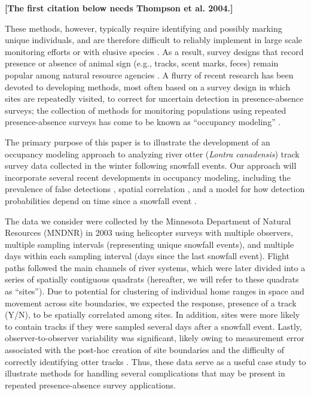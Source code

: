 \documentclass[11pt]{article}
\begin{document}
\textbf{[The first citation below needs Thompson et al. 2004.]}

These methods, however, typically require identifying and possibly marking
unique individuals, and are therefore difficult to reliably implement in large
scale monitoring efforts or with elusive species \citep{Stanley2005,
Johnson2008}.  As a result, survey designs that record presence or absence of
animal sign (e.g., tracks, scent marks, feces) remain popular among natural
resource agencies \citep{Stanley2005}.  A flurry of recent research has been
devoted to developing methods, most often based on a survey design in which
sites are repeatedly visited, to correct for uncertain detection in
presence-absence surveys; the collection of methods for monitoring populations
using repeated presence-absence surveys has come to be known as ``occupancy
modeling'' \citep{MacKenzie2006, Royle2008}.

The primary purpose of this paper is to illustrate the development of an
occupancy modeling approach to analyzing river otter (\textit{Lontra
canadensis}) track survey data collected in the winter following snowfall
events.  Our approach will incorporate several recent developments in occupancy
modeling, including the prevalence of false detections \citep{Royle2006},
spatial correlation \citep{Magoun2007}, and a model for how detection
probabilities depend on time since a snowfall event \citep{Stanley2005}.

The data we consider were collected by the Minnesota Department of Natural
Resources (MNDNR) in 2003 using helicopter surveys with multiple observers,
multiple sampling intervals (representing unique snowfall events), and multiple
days within each sampling interval (days since the last snowfall event).
Flight paths followed the main channels of river systems, which were later
divided into a series of spatially contiguous quadrats (hereafter, we will
refer to these quadrats as ``sites'').  Due to potential for clustering of
individual home ranges in space and movement across site boundaries, we
expected the response, presence of a track (Y/N), to be spatially correlated
among sites.  In addition, sites were more likely to contain tracks if they
were sampled several days after a snowfall event.  Lastly, observer-to-observer
variability was significant, likely owing to measurement error associated with
the post-hoc creation of site boundaries and the difficulty of correctly
identifying otter tracks \citep{Evans2009}.  Thus, these data serve as a
useful case study to illustrate methods for handling several complications that
may be present in repeated presence-absence survey applications.
\end{document}

